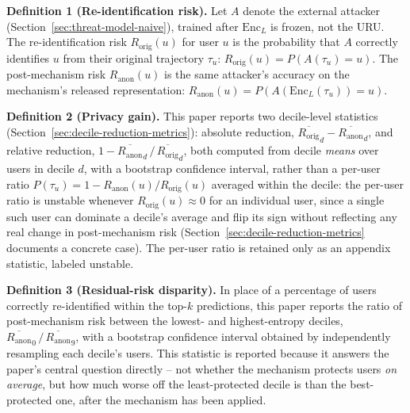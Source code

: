 \textbf{Definition 1 (Re-identification risk).} Let $A$ denote the
external attacker (Section~\ref{sec:threat-model-naive}), trained
after $\mathrm{Enc}_L$ is frozen, not the URU. The re-identification
risk $R_{\mathrm{orig}}(u)$ for user $u$ is the probability that $A$
correctly identifies $u$ from their original trajectory $\tau_u$:
$R_{\mathrm{orig}}(u) = P(A(\tau_u) = u)$. The post-mechanism risk
$R_{\mathrm{anon}}(u)$ is the same attacker's accuracy on the
mechanism's released representation: $R_{\mathrm{anon}}(u) =
P(A(\mathrm{Enc}_L(\tau_u)) = u)$.

\textbf{Definition 2 (Privacy gain).} This paper reports two
decile-level statistics (Section~\ref{sec:decile-reduction-metrics}):
absolute reduction, $\overline{R_{\mathrm{orig}}}_d -
\overline{R_{\mathrm{anon}}}_d$, and relative reduction, $1 -
\overline{R_{\mathrm{anon}}}_d \,/\, \overline{R_{\mathrm{orig}}}_d$,
both computed from decile \emph{means} over users in decile $d$, with a
bootstrap confidence interval, rather than a per-user ratio
$P(\tau_u) = 1 - R_{\mathrm{anon}}(u) / R_{\mathrm{orig}}(u)$ averaged
within the decile: the per-user ratio is unstable whenever
$R_{\mathrm{orig}}(u) \approx 0$ for an individual user, since a single
such user can dominate a decile's average and flip its sign without
reflecting any real change in post-mechanism risk
(Section~\ref{sec:decile-reduction-metrics} documents a concrete case).
The per-user ratio is retained only as an appendix statistic, labeled
unstable.

\textbf{Definition 3 (Residual-risk disparity).} In place of a
percentage of users correctly re-identified within the top-$k$
predictions, this paper reports the ratio of post-mechanism risk
between the lowest- and highest-entropy deciles,
$\overline{R_{\mathrm{anon}}}_0 \,/\, \overline{R_{\mathrm{anon}}}_9$,
with a bootstrap confidence interval obtained by independently
resampling each decile's users. This statistic is reported because it
answers the paper's central question directly -- not whether the
mechanism protects users \emph{on average}, but how much worse off the
least-protected decile is than the best-protected one, after the
mechanism has been applied.

